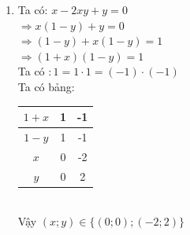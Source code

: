 \begin{bt}
{\begin{enumerate}
$$\begin{aligned}
&=\mathrm{n}-2 . \\
& \Rightarrow \mathrm{S}>\mathrm{n}-2(2)
\end{aligned}
$$
Từ (1) và (2) suy ra $\mathrm{n}-2<\mathrm{S}<\mathrm{n}-1$ hay $\mathrm{S}$ không là số nguyên.
\item Ta có:
$x-2 x y+y=0$ \\
$\Rightarrow x(1-y)+y=0$ \\
$\Rightarrow(1-y)+x(1-y)=1$ \\
$\Rightarrow(1+x)(1-y)=1$\\
Ta có $: 1=1 \cdot 1=(-1) \cdot(-1)$\\
Ta có bảng:\\
\begin{tabular}{|c|c|c|}
\hline $1+x$ & 1 & -1 \\
\hline $1-y$ & 1 & -1 \\
\hline $x$ & 0 & -2 \\
\hline $y$ & 0 & 2 \\
\hline
\end{tabular}\\
Vậy $(x ; y) \in\{(0 ; 0) ;(-2 ; 2)\}$
    \end{enumerate}
} 
\end{bt}

